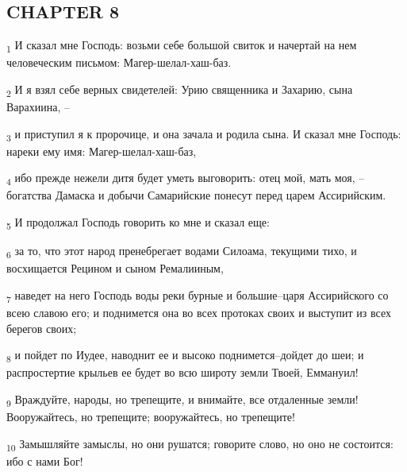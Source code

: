 \subsection{CHAPTER 8}
\begin{tcolorbox}
\textsubscript{1} И сказал мне Господь: возьми себе большой свиток и начертай на нем человеческим письмом: Магер-шелал-хаш-баз.
\end{tcolorbox}
\begin{tcolorbox}
\textsubscript{2} И я взял себе верных свидетелей: Урию священника и Захарию, сына Варахиина, --
\end{tcolorbox}
\begin{tcolorbox}
\textsubscript{3} и приступил я к пророчице, и она зачала и родила сына. И сказал мне Господь: нареки ему имя: Магер-шелал-хаш-баз,
\end{tcolorbox}
\begin{tcolorbox}
\textsubscript{4} ибо прежде нежели дитя будет уметь выговорить: отец мой, мать моя, --богатства Дамаска и добычи Самарийские понесут перед царем Ассирийским.
\end{tcolorbox}
\begin{tcolorbox}
\textsubscript{5} И продолжал Господь говорить ко мне и сказал еще:
\end{tcolorbox}
\begin{tcolorbox}
\textsubscript{6} за то, что этот народ пренебрегает водами Силоама, текущими тихо, и восхищается Рецином и сыном Ремалииным,
\end{tcolorbox}
\begin{tcolorbox}
\textsubscript{7} наведет на него Господь воды реки бурные и большие--царя Ассирийского со всею славою его; и поднимется она во всех протоках своих и выступит из всех берегов своих;
\end{tcolorbox}
\begin{tcolorbox}
\textsubscript{8} и пойдет по Иудее, наводнит ее и высоко поднимется--дойдет до шеи; и распростертие крыльев ее будет во всю широту земли Твоей, Еммануил!
\end{tcolorbox}
\begin{tcolorbox}
\textsubscript{9} Враждуйте, народы, но трепещите, и внимайте, все отдаленные земли! Вооружайтесь, но трепещите; вооружайтесь, но трепещите!
\end{tcolorbox}
\begin{tcolorbox}
\textsubscript{10} Замышляйте замыслы, но они рушатся; говорите слово, но оно не состоится: ибо с нами Бог!
\end{tcolorbox}
